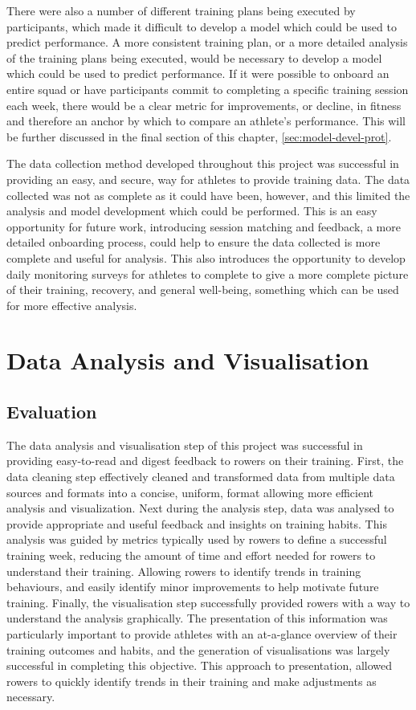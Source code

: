 There were also a number of different training plans being executed by participants, which made it difficult to develop a model which could be used to predict performance. A more consistent training plan, or a more detailed analysis of the training plans being executed, would be necessary to develop a model which could be used to predict performance. If it were possible to onboard an entire squad or have participants commit to completing a specific training session each week, there would be a clear metric for improvements, or decline, in fitness and therefore an anchor by which to compare an athlete's performance. This will be further discussed in the final section of this chapter, \autoref{sec:model-devel-prot}.

The data collection method developed throughout this project was successful in providing an easy, and secure, way for athletes to provide training data. The data collected was not as complete as it could have been, however, and this limited the analysis and model development which could be performed. This is an easy opportunity for future work, introducing session matching and feedback, a more detailed onboarding process, could help to ensure the data collected is more complete and useful for analysis. This also introduces the opportunity to develop daily monitoring surveys for athletes to complete to give a more complete picture of their training, recovery, and general well-being, something which can be used for more effective analysis.

\section{\label{sec:data-anyl-diss}Data Analysis and Visualisation}
\subsection{Evaluation}
The data analysis and visualisation step of this project was successful in providing easy-to-read and digest feedback to rowers on their training. First, the data cleaning step effectively cleaned and transformed data from multiple data sources and formats into a concise, uniform, format allowing more efficient analysis and visualization. Next during the analysis step, data was analysed to provide appropriate and useful feedback and insights on training habits. This analysis was guided by metrics typically used by rowers to define a successful training week, reducing the amount of time and effort needed for rowers to understand their training. Allowing rowers to identify trends in training behaviours, and easily identify minor improvements to help motivate future training. Finally, the visualisation step successfully provided rowers with a way to understand the analysis graphically. The presentation of this information was particularly important to provide athletes with an at-a-glance overview of their training outcomes and habits, and the generation of visualisations was largely successful in completing this objective. This approach to presentation, allowed rowers to quickly identify trends in their training and make adjustments as necessary.

